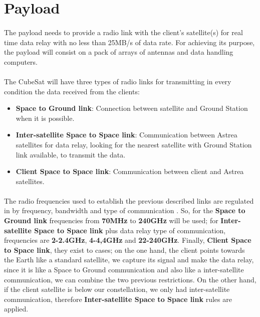 \section{Payload}
\paragraph{}The payload needs to provide a radio link with the client's satellite(s) for real time data relay with no less than 25MB/s of data rate. For achieving its purpose, the payload will consist on a pack of arrays of antennas and data handling computers.

\paragraph{}The CubeSat will have three types of radio links for transmitting in every condition the data received from the clients:
\begin{itemize}
	\item \textbf{Space to Ground link}: Connection between satellite and Ground Station when it is possible.
	\item \textbf{Inter-satellite Space to Space link}: Communication between Astrea satellites for data relay, looking for the nearest satellite with Ground Station link available, to transmit the data.
	\item \textbf{Client Space to Space link}: Communication between client and Astrea satellites.
\end{itemize}
\paragraph{}The radio frequencies used to establish the previous described links are regulated in \cite{SecretariadeEstadodetelecomunicacionesyparalasociedaddelainformacion.2015} by frequency, bandwidth and type of communication . So, for the \textbf{Space to Ground link} frequencies from \textbf{70MHz} to \textbf{240GHz} will be used; for \textbf{Inter-satellite Space to Space link} plus data relay type of communication, frequencies are \textbf{2-2.4GHz}, \textbf{4-4,4GHz} and \textbf{22-240GHz}. Finally, \textbf{Client Space to Space link}, they exist to cases; on the one hand, the client points towards the Earth like a standard satellite, we capture its signal and make the data relay, since it is like a Space to Ground communication and also like a inter-satellite communication, we can combine the two previous restrictions. On the other hand, if the client satellite is below our constellation, we only had inter-satellite communication, therefore \textbf{Inter-satellite Space to Space link} rules are applied.


